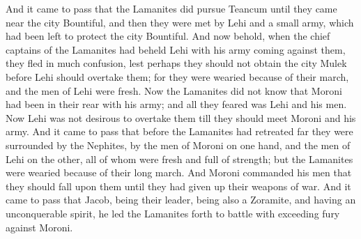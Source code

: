 \bverse \iffalse And it came to pass that the Lamanites did pursue Teancum until they came near the city Bountiful, and then they were met by Lehi and a small army, which had been left to protect the city Bountiful. \fi
And it came to pass that the Lamanites did pursue Teancum until they came near the city Bountiful, and then they were met by Lehi and a small army, which had been left to protect the city Bountiful.
\bverse \iffalse And now behold, when the chief captains of the Lamanites had beheld Lehi with his army coming against them, they fled in much confusion, lest perhaps they should not obtain the city Mulek before Lehi should overtake them; for they were wearied because of their march, and the men of Lehi were fresh. \fi
And now behold, when the chief captains of the Lamanites had beheld Lehi with his army coming against them, they fled in much confusion, lest perhaps they should not obtain the city Mulek before Lehi should overtake them; for they were wearied because of their march, and the men of Lehi were fresh.
\bverse \iffalse Now the Lamanites did not know that Moroni had been in their rear with his army; and all they feared was Lehi and his men. \fi
Now the Lamanites did not know that Moroni had been in their rear with his army; and all they feared was Lehi and his men.
\bverse \iffalse Now Lehi was not desirous to overtake them till they should meet Moroni and his army. \fi
Now Lehi was not desirous to overtake them till they should meet Moroni and his army.
\bverse \iffalse And it came to pass that before the Lamanites had retreated far they were surrounded by the Nephites, by the men of Moroni on one hand, and the men of Lehi on the other, all of whom were fresh and full of strength; but the Lamanites were wearied because of their long march. \fi
And it came to pass that before the Lamanites had retreated far they were surrounded by the Nephites, by the men of Moroni on one hand, and the men of Lehi on the other, all of whom were fresh and full of strength; but the Lamanites were wearied because of their long march.
\bverse \iffalse And Moroni commanded his men that they should fall upon them until they had given up their weapons of war. \fi
And Moroni commanded his men that they should fall upon them until they had given up their weapons of war.
\bverse \iffalse And it came to pass that Jacob, being their leader, being also a Zoramite, and having an unconquerable spirit, he led the Lamanites forth to battle with exceeding fury against Moroni. \fi
And it came to pass that Jacob, being their leader, being also a Zoramite, and having an unconquerable spirit, he led the Lamanites forth to battle with exceeding fury against Moroni.
